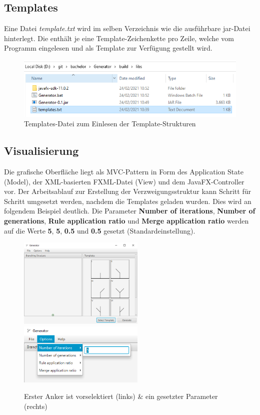 \subsection*{Templates}
Eine Datei \textit{template.txt} wird im selben Verzeichnis wie die ausführbare jar-Datei hinterlegt.
Die enthält je eine Template-Zeichenkette pro Zeile, welche vom Programm eingelesen und als Template
zur Verfügung gestellt wird.
\begin{figure}[H]
    \centering
    \includegraphics[width=12cm]{../images/templates_file.png}
    \caption{Templates-Datei zum Einlesen der Template-Strukturen}
\end{figure}

\newpage

\subsection*{Visualisierung}
Die grafische Oberfläche liegt als MVC-Pattern in Form des Application State (Model), der XML-basierten FXML-Datei (View)
und dem JavaFX-Controller vor.
Der Arbeitsablauf zur Erstellung der Verzweigungsstruktur kann Schritt für Schritt umgesetzt werden, nachdem die Templates
geladen wurden.
Dies wird an folgendem Beispiel deutlich.
Die Parameter \textbf{Number of iterations}, \textbf{Number of generations}, \textbf{Rule application ratio} und
\textbf{Merge application ratio} werden auf die Werte \textbf{5}, \textbf{5}, \textbf{0.5} und \textbf{0.5} gesetzt
(Standardeinstellung).
\begin{figure}[H]
    \centering
    \includegraphics[width=6cm]{../images/UI_templates.png}
    \includegraphics[width=6cm]{../images/UI_parameters.png}
    \caption{Erster Anker ist vorselektiert (links) \& ein gesetzter Parameter (rechts)}
\end{figure}

